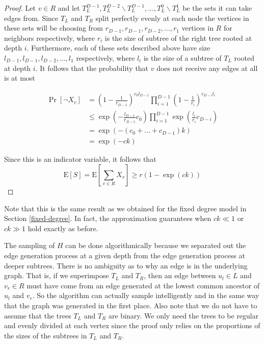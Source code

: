 \documentclass[]{article}
\newcommand{\E}{\text{E}}
\newcommand{\vs}{\vspace{0.2cm}}
\begin{document}
\begin{proof}
Let $v\in R$ and let $T_L^{D-1}, T_L^{D-2}\backslash T_L^{D-1},
\ldots, T_L^0\backslash T_L^1$ be the sets it can take edges
from. Since $T_L$ and $T_R$ split perfectly evenly at each node the
vertices in these sets will be choosing from $r_{D-1}, r_{D-1},
r_{D-2},\ldots, r_{1}$ vertices in $R$ for neighbors respectively,
where $r_i$ is the size of subtree of the right tree rooted at depth
$i$. Furthermore, each of these sets described above have size
$l_{D-1}, l_{D-1}, l_{D-2}, \ldots, l_{1}$ respectively, where $l_i$
is the size of a subtree of $T_L$ rooted at depth $i$. It follows that
the probability that $v$ does not receive any edges at all is at most

\begin{align*}
	      \Pr[\lnot X_v] 
	&=    \left(1-\frac{1}{r_{D-1}}\right)^{c_0l_{D-1}}\prod_{i=1}^{D-1}\left(1 - \frac{1}{r_i}\right)^{c_{D-i} l_i} \\
	&\leq \exp\left(-\frac{l_{D-1}}{r_{D-1}}c_0\right)\prod_{i=1}^{D-1} \exp\left(\frac{l_i}{r_i}c_{D-i}\right) \\
	&=    \exp\left(-(c_0 + \ldots + c_{D-1})k\right) \\
	&=    \exp(-ck)
\end{align*}

Since this is an indicator variable, it follows that 
\[ \E[S] = \E\left[\sum_{v \in R} X_v \right] \geq r \left(1-\exp(ck)\right) \]
\end{proof}

Note that this is the same result as we obtained for the fixed degree
model in Section \ref{fixed-degree}. In fact, the approximation
guarantees when $ck \ll 1$ or $ck \gg 1$ hold exactly as before.\vs

The sampling of $H$ can be done algorithmically because we separated
out the edge generation process at a given depth from the edge
generation process at deeper subtrees. There is no ambiguity as to why
an edge is in the underlying graph. That is, if we superimpose $T_L$
and $T_R$, then an edge between $u_l\in L$ and $v_r\in R$ must have
come from an edge generated at the lowest common ancestor of $u_l$ and
$v_r$. So the algorithm can actually sample intelligently and in the
same way that the graph was generated in the first place. Also note
that we do not have to assume that the trees $T_L$ and $T_R$ are
binary. We only need the trees to be regular and evenly divided at
each vertex since the proof only relies on the proportions of the
sizes of the subtrees in $T_L$ and $T_R$.
\end{document}
